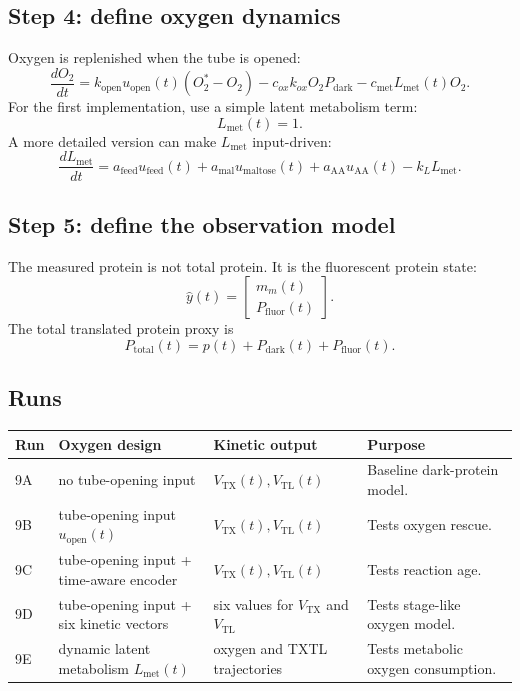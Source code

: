 \documentclass[11pt]{article}
\newcommand{\TX}{\mathrm{TX}}
\newcommand{\TL}{\mathrm{TL}}
\newcommand{\dark}{\mathrm{dark}}
\newcommand{\fluor}{\mathrm{fluor}}
\newcommand{\open}{\mathrm{open}}
\newcommand{\met}{\mathrm{met}}
\begin{document}
\subsection{Step 4: define oxygen dynamics}

Oxygen is replenished when the tube is opened:
\begin{equation}
    \frac{dO_2}{dt}
    =
    k_{\open}u_{\open}(t)(O_2^\ast-O_2)
    -c_{ox}k_{ox}O_2P_{\dark}
    -c_{\met}L_{\met}(t)O_2.
\end{equation}
For the first implementation, use a simple latent metabolism term:
\begin{equation}
    L_{\met}(t)=1.
\end{equation}
A more detailed version can make $L_{\met}$ input-driven:
\begin{equation}
    \frac{dL_{\met}}{dt}
    =
    a_{\mathrm{feed}}u_{\mathrm{feed}}(t)
    +a_{\mathrm{mal}}u_{\mathrm{maltose}}(t)
    +a_{\mathrm{AA}}u_{\mathrm{AA}}(t)
    -k_LL_{\met}.
\end{equation}

\subsection{Step 5: define the observation model}

The measured protein is not total protein. It is the fluorescent protein state:
\begin{equation}
    \widehat{y}(t)=
    \begin{bmatrix}
        m_m(t)\\
        P_{\fluor}(t)
    \end{bmatrix}.
\end{equation}
The total translated protein proxy is
\begin{equation}
    P_{\mathrm{total}}(t)=p(t)+P_{\dark}(t)+P_{\fluor}(t).
\end{equation}

\subsection{Runs}

\begin{center}
\begin{tabularx}{\textwidth}{lllX}
\toprule
Run & Oxygen design & Kinetic output & Purpose \\
\midrule
9A & no tube-opening input & $V_{\TX}(t),V_{\TL}(t)$ & Baseline dark-protein model. \\
9B & tube-opening input $u_{\open}(t)$ & $V_{\TX}(t),V_{\TL}(t)$ & Tests oxygen rescue. \\
9C & tube-opening input + time-aware encoder & $V_{\TX}(t),V_{\TL}(t)$ & Tests reaction age. \\
9D & tube-opening input + six kinetic vectors & six values for $V_{\TX}$ and $V_{\TL}$ & Tests stage-like oxygen model. \\
9E & dynamic latent metabolism $L_{\met}(t)$ & oxygen and TXTL trajectories & Tests metabolic oxygen consumption. \\
\bottomrule
\end{tabularx}
\end{center}
\end{document}

